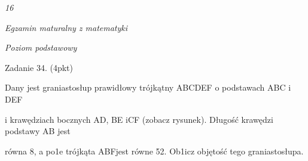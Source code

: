 \documentclass[a4paper,12pt]{article}
\begin{document}
{\it 16}

{\it Egzamin maturalny z matematyki}

{\it Poziom podstawowy}

Zadanie 34. (4pkt)

Dany jest graniastosłup prawidłowy trójkątny ABCDEF o podstawach ABC i DEF

i krawędziach bocznych AD, BE iCF (zobacz rysunek). Długość krawędzi podstawy AB jest

równa 8, a po1e trójkąta ABFjest równe 52. Ob1icz objętość tego graniastosłupa.
\end{document}
